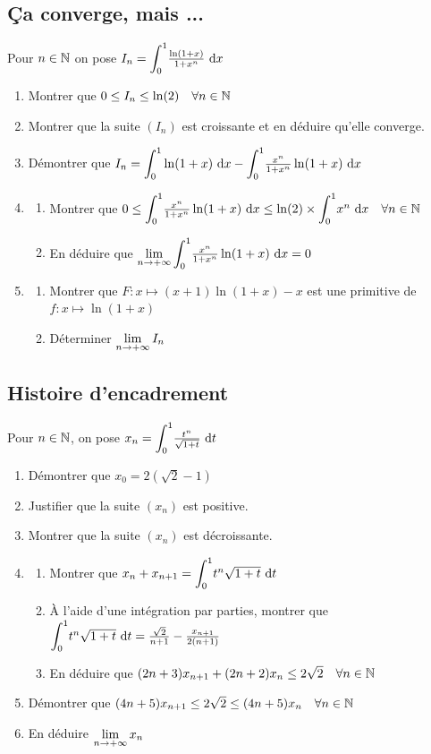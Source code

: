 \documentclass[oneside,12pt]{book}          %
\begin{document}
\subsection{Ça converge, mais ...}
Pour ${n\in\mathbb N}$ on pose $I_n={\displaystyle\int_{0}^{1}}\frac{\ln(1+x)}{1+x^n}{\,\,\mathrm{d}} x$
\begin{enumerate}
    \item Montrer que $0\leq I_n \leq \ln(2)\quad\forall{n\in\mathbb N}$
    \item Montrer que la suite $(I_n)$ est croissante et en déduire qu'elle converge.
    \item Démontrer que $I_n={\displaystyle\int_{0}^{1}}\ln(1+x){\,\,\mathrm{d}} x - {\displaystyle\int_{0}^{1}}\frac{x^n}{1+x^n}\ln(1+x){\,\,\mathrm{d}} x$
    \item \begin{enumerate}
        \item Montrer que $0\leq {\displaystyle\int_{0}^{1}}\frac{x^n}{1+x^n}\ln(1+x){\,\,\mathrm{d}} x \leq \ln(2)\times{\displaystyle\int_{0}^{1}}x^n{\,\,\mathrm{d}} x \quad \forall{n\in\mathbb N}$
        \item En déduire que ${\lim\limits_{n\to +\infty}}\, {\displaystyle\int_{0}^{1}}\frac{x^n}{1+x^n}\ln(1+x){\,\,\mathrm{d}} x=0$
    \end{enumerate}
    \item \begin{enumerate}
        \item Montrer que $F:x\mapsto (x+1)\ln(1+x)-x$ est une primitive de $f:x\mapsto\ln(1+x)$
        \item Déterminer ${\lim\limits_{n\to +\infty}}\, I_n$
    \end{enumerate}
\end{enumerate}



\subsection{Histoire d'encadrement}
Pour ${n\in\mathbb N}$, on pose $x_n={\displaystyle\int_{0}^{1}}\frac{t^n}{\sqrt{1+t}}{\,\,\mathrm{d}} t$
\begin{enumerate}
    \item Démontrer que $x_0=2(\sqrt{2}-1)$
    \item Justifier que la suite $(x_n)$ est positive.
    \item Montrer que la suite $(x_n)$ est décroissante.
    \item \begin{enumerate}
        \item Montrer que $x_n+x_{n+1}={\displaystyle\int_{0}^{1}}t^n\sqrt{1+t}{\,\,\mathrm{d}} t$
        \item À l'aide d'une intégration par parties, montrer que ${\displaystyle\int_{0}^{1}}t^n\sqrt{1+t}{\,\,\mathrm{d}} t=\frac{\sqrt{2}}{n+1}-\frac{x_{n+1}}{2(n+1)}$
        \item En déduire que $(2n+3)x_{n+1}+(2n+2)x_n\leq 2\sqrt{2}\quad\forall{n\in\mathbb N}$
    \end{enumerate}
    \item Démontrer que $(4n+5)x_{n+1}\leq2\sqrt{2}\leq(4n+5)x_n\quad\forall{n\in\mathbb N}$
    \item En déduire ${\lim\limits_{n\to +\infty}}\, x_n$
\end{enumerate}
\end{document}
